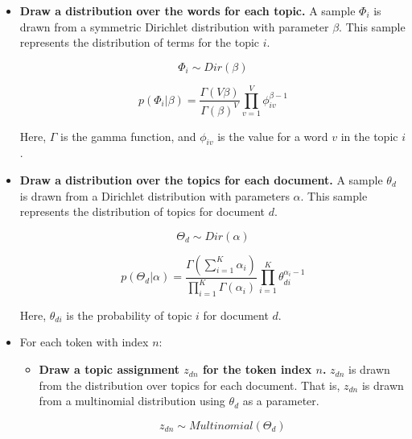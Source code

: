 \begin{itemize}
    \item \textbf{Draw a distribution over the words for each topic.}
        A sample $\Phi_i$ is drawn from a symmetric Dirichlet distribution with parameter $\beta$. 
        This sample represents the distribution of terms for the topic $i$.

        \begin{equation}
            \Phi_i \sim Dir(\beta)
        \end{equation}

        \begin{equation}
            p(\Phi_i | \beta) = \frac{\Gamma(V\beta)}{{\Gamma(\beta)}^V} \prod^V_{v=1}\phi^{\beta-1}_{iv}
        \end{equation}

        Here, $\Gamma$ is the gamma function, and $\phi_{iv}$ is the value for a word $v$ in the topic $i$.

    \item \textbf{Draw a distribution over the topics for each document.}
        A sample $\theta_d$ is drawn from a Dirichlet distribution with parameters $\alpha$.
        This sample represents the distribution of topics for document $d$.

        \begin{equation}
            \Theta_d \sim Dir(\alpha)
        \end{equation}

        \begin{equation}
            p(\Theta_d | \alpha) = \frac{\Gamma(\sum^K_{i=1}\alpha_i)}{\prod_{i=1}^K\Gamma(\alpha_i)}\prod_{i=1}^K\theta_{di}^{\alpha_i-1}
        \end{equation}

        Here, $\theta_{di}$ is the probability of topic $i$ for document $d$.

    \item For each token with index $n$:

        \begin{itemize}
            \item \textbf{Draw a topic assignment $z_{dn}$ for the token index $n$.} 
                $z_{dn}$ is drawn from the distribution over topics for each document. 
                That is, $z_{dn}$ is drawn from a multinomial distribution using $\theta_d$ as a parameter.

                \begin{equation}
                    z_{dn} \sim Multinomial(\Theta_d)
                \end{equation}


\end{itemize}
\end{itemize}
